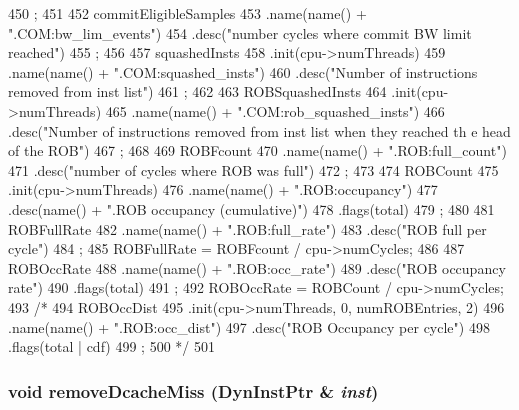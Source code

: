 \begin{DoxyCode}
{450         ;
451 
452     commitEligibleSamples
453         .name(name() + ".COM:bw_lim_events")
454         .desc("number cycles where commit BW limit reached")
455         ;
456 
457     squashedInsts
458         .init(cpu->numThreads)
459         .name(name() + ".COM:squashed_insts")
460         .desc("Number of instructions removed from inst list")
461         ;
462 
463     ROBSquashedInsts
464         .init(cpu->numThreads)
465         .name(name() + ".COM:rob_squashed_insts")
466         .desc("Number of instructions removed from inst list when they reached th
      e head of the ROB")
467         ;
468 
469     ROBFcount
470         .name(name() + ".ROB:full_count")
471         .desc("number of cycles where ROB was full")
472         ;
473 
474     ROBCount
475         .init(cpu->numThreads)
476         .name(name() + ".ROB:occupancy")
477         .desc(name() + ".ROB occupancy (cumulative)")
478         .flags(total)
479         ;
480 
481     ROBFullRate
482         .name(name() + ".ROB:full_rate")
483         .desc("ROB full per cycle")
484         ;
485     ROBFullRate = ROBFcount / cpu->numCycles;
486 
487     ROBOccRate
488         .name(name() + ".ROB:occ_rate")
489         .desc("ROB occupancy rate")
490         .flags(total)
491         ;
492     ROBOccRate = ROBCount / cpu->numCycles;
493 /*
494     ROBOccDist
495         .init(cpu->numThreads, 0, numROBEntries, 2)
496         .name(name() + ".ROB:occ_dist")
497         .desc("ROB Occupancy per cycle")
498         .flags(total | cdf)
499         ;
500 */
501 }
\end{DoxyCode}
\hypertarget{classLWBackEnd_a3eec16e4a583e6312ba14ffe5a004296}{
\subsubsection[{removeDcacheMiss}]{\setlength{\rightskip}{0pt plus 5cm}void removeDcacheMiss ({\bf DynInstPtr} \& {\em inst})}}
\label{classLWBackEnd_a3eec16e4a583e6312ba14ffe5a004296}



